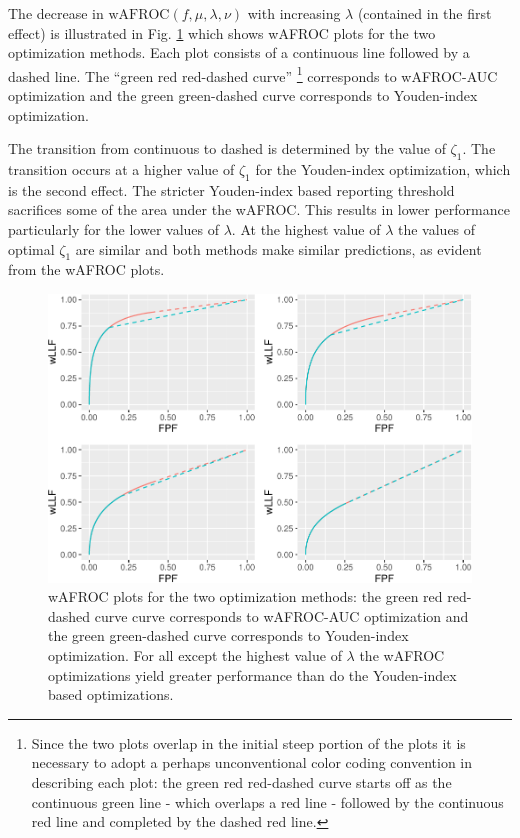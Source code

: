 \documentclass[
]{book}
\begin{document}
The decrease in \(\text{wAFROC} \left ( f, \mu, \lambda, \nu \right )\) with increasing \(\lambda\) (contained in the first effect) is illustrated in Fig. \ref{fig:optim-op-point-vary-lambda-wafroc} which shows wAFROC plots for the two optimization methods. Each plot consists of a continuous line followed by a dashed line. The ``green red red-dashed curve'' \footnote{Since the two plots overlap in the initial steep portion of the plots it is necessary to adopt a perhaps unconventional color coding convention in describing each plot: the green red red-dashed curve starts off as the continuous green line - which overlaps a red line - followed by the continuous red line and completed by the dashed red line.} corresponds to wAFROC-AUC optimization and the green green-dashed curve corresponds to Youden-index optimization.

The transition from continuous to dashed is determined by the value of \(\zeta_1\). The transition occurs at a higher value of \(\zeta_1\) for the Youden-index optimization, which is the second effect. The stricter Youden-index based reporting threshold sacrifices some of the area under the wAFROC. This results in lower performance particularly for the lower values of \(\lambda\). At the highest value of \(\lambda\) the values of optimal \(\zeta_1\) are similar and both methods make similar predictions, as evident from the wAFROC plots.

\begin{figure}
\centering
\includegraphics{21-optim-op-point_files/figure-latex/optim-op-point-vary-lambda-wafroc-1.pdf}
\caption{\label{fig:optim-op-point-vary-lambda-wafroc}wAFROC plots for the two optimization methods: the green red red-dashed curve curve corresponds to wAFROC-AUC optimization and the green green-dashed curve corresponds to Youden-index optimization. For all except the highest value of \(\lambda\) the wAFROC optimizations yield greater performance than do the Youden-index based optimizations.}
\end{figure}
\end{document}
